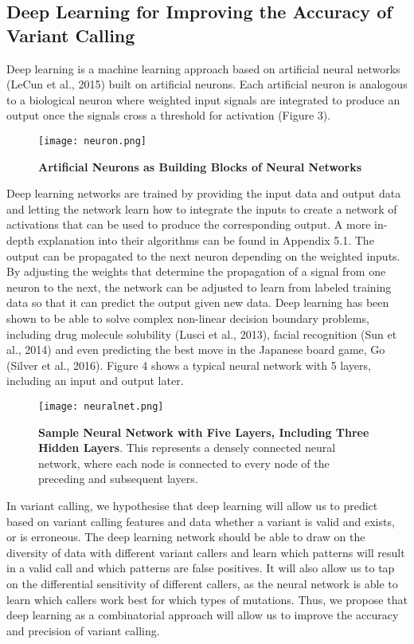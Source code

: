 \documentclass{article}
\begin{document}
\subsection{Deep Learning for Improving the Accuracy of Variant Calling} 
Deep learning is a machine learning approach based on artificial neural networks (LeCun et al., 2015) built on artificial neurons. Each artificial neuron is analogous to a biological neuron where weighted input signals are integrated to produce an output once the signals cross a threshold for activation (Figure 3).  
\begin{figure}[H]
\texttt{[image: neuron.png]}
\centering
\caption{\textbf{Artificial Neurons as Building Blocks of Neural Networks}}
\end{figure}
Deep learning networks are trained by providing the input data and output data and letting the network learn how to integrate the inputs to create a network of activations that can be used to produce the corresponding output. A more in-depth explanation into their algorithms can be found in Appendix 5.1. 
The output can be propagated to the next neuron depending on the weighted inputs.
By adjusting the weights that determine the propagation of a signal from one neuron to the next, the network can be adjusted to learn from labeled training data so that it can predict the output given new data.
Deep learning has been shown to be able to solve  complex non-linear decision boundary problems, including drug molecule solubility (Lusci et al., 2013), facial recognition (Sun et al., 2014) and even predicting the best move in the Japanese board game, Go (Silver et al., 2016). Figure 4 shows a typical neural network with 5 layers, including an input and output later.
\begin{figure}[H]
\texttt{[image: neuralnet.png]}
\centering
\caption{\textbf{Sample Neural Network with Five Layers, Including Three Hidden Layers}. This represents a densely connected neural network, where each node is connected to every node of the preceding and subsequent layers.}
\end{figure}
In variant calling, we hypothesise that deep learning will allow us to predict based on variant calling features and data whether a variant is valid and exists, or is erroneous. The deep learning network should be able to draw on the diversity of data with different variant callers and learn which patterns will result in a valid call and which patterns are false positives. It will also allow us to tap on the differential sensitivity of different callers, as the neural network is able to learn which callers work best for which types of mutations. Thus, we propose that deep learning as a combinatorial approach will allow us to improve the accuracy and precision of variant calling.
\end{document}
